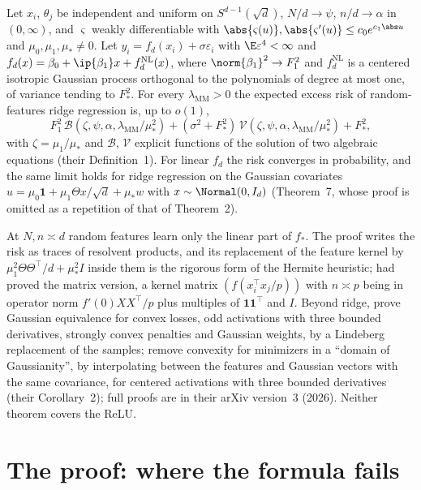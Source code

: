 \begin{refsection}
\begin{theorem}\label{thm:kernels:mm}
Let $x_i$, $\theta_j$ be independent and uniform on $S^{d-1}(\sqrt d)$, $N/d\to\psi$, $n/d\to\alpha$ in $(0,\infty)$, and $\varsigma$ weakly differentiable with $\abs{\varsigma(u)},\abs{\varsigma'(u)}\le c_0e^{c_1\abs u}$ and $\mu_0,\mu_1,\mu_*\ne0$. Let $y_i=f_d(x_i)+\sigma\varepsilon_i$ with $\E\varepsilon^4<\infty$ and $f_d(x)=\beta_0+\ip{\beta_1}x+f_d^{\mathrm{NL}}(x)$, where $\norm{\beta_1}^2\to F_1^2$ and $f_d^{\mathrm{NL}}$ is a centered isotropic Gaussian process orthogonal to the polynomials of degree at most one, of variance tending to $F_*^2$. For every $\lambda_{\mathrm{MM}}>0$ the expected excess risk of random-features ridge regression is, up to $o(1)$,
\[
F_1^2\,\mathscr B(\zeta,\psi,\alpha,\lambda_{\mathrm{MM}}/\mu_*^2)+(\sigma^2+F_*^2)\,\mathscr V(\zeta,\psi,\alpha,\lambda_{\mathrm{MM}}/\mu_*^2)+F_*^2,
\]
with $\zeta=\mu_1/\mu_*$ and $\mathscr B$, $\mathscr V$ explicit functions of the solution of two algebraic equations (their Definition~1). For linear $f_d$ the risk converges in probability, and the same limit holds for ridge regression on the Gaussian covariates $u=\mu_0\mathbf1+\mu_1\Theta x/\sqrt d+\mu_*w$ with $x\sim\Normal(0,I_d)$ (Theorem~7, whose proof is omitted as a repetition of that of Theorem~2).
\end{theorem}

At $N,n\asymp d$ random features learn only the linear part of $f_*$. The proof writes the risk as traces of resolvent products, and its replacement of the feature kernel by $\mu_1^2\Theta\Theta^\top/d+\mu_*^2I$ inside them is the rigorous form of the Hermite heuristic; \textcite[Theorem~2.1]{ElKaroui2010} had proved the matrix version, a kernel matrix $(f(x_i^\top x_j/p))$ with $n\asymp p$ being in operator norm $f'(0)XX^\top/p$ plus multiples of $\mathbf1\mathbf1^\top$ and $I$. Beyond ridge, \textcite{HuLu2023} prove Gaussian equivalence for convex losses, odd activations with three bounded derivatives, strongly convex penalties and Gaussian weights, by a Lindeberg replacement of the samples; \textcite{MontanariSaeed2022} remove convexity for minimizers in a ``domain of Gaussianity'', by interpolating between the features and Gaussian vectors with the same covariance, for centered activations with three bounded derivatives (their Corollary~2); full proofs are in their arXiv version~3 (2026). Neither theorem covers the ReLU.

\section{The proof: where the formula fails}\label{sec:kernels:counter}


\end{refsection}
